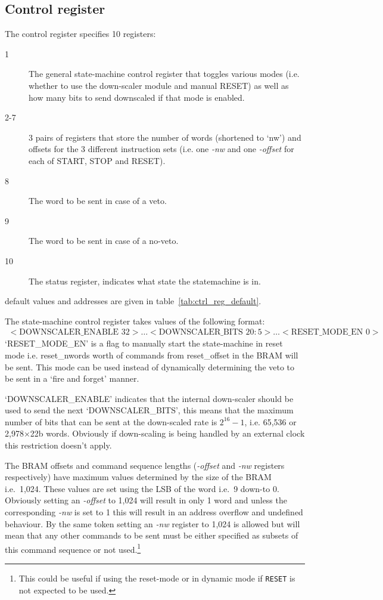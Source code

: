 \documentclass[]{report}
\begin{document}
    \subsection{Control register} %
    \label{sub:ctrl_reg}
    The control register specifies 10 registers:
    \begin{description}
        \item[1] The general state-machine control register that toggles various modes (i.e. whether to use the down-scaler module and manual RESET) as well as how many bits to send downscaled if that mode is enabled.
        \item[2-7] 3 pairs of registers that store the number of words (shortened to `nw') and offsets for the 3 different instruction sets (i.e. one \emph{-nw} and one \emph{-offset} for each of START, STOP and RESET).
        \item[8] The word to be sent in case of a veto.
        \item[9] The word to be sent in case of a no-veto.
        \item[10] The status register, indicates what state the statemachine is in.
    \end{description}
    default values and addresses are given in table~\ref{tab:ctrl_reg_default}.
    
    The state-machine control register takes values of the following format:
    \begin{align} \label{fmt:control_reg}
        <\text{DOWNSCALER\_ENABLE } 32>\ldots<\text{DOWNSCALER\_BITS } 20:5>\ldots<\text{RESET\_MODE\_EN } 0>
    \end{align}
    `RESET\_MODE\_EN' is a flag to manually start the state-machine in reset mode i.e. reset\_nwords worth of commands from reset\_offset in the BRAM will be sent. This mode can be used instead of dynamically determining the veto to be sent in a `fire and forget' manner.

    `DOWNSCALER\_ENABLE' indicates that the internal down-scaler should be used to send the next `DOWNSCALER\_BITS', this means that the maximum number of bits that can be sent at the down-scaled rate is \(2^{16} - 1\), i.e. 65,536 or 2,978\(\times\)22b words. Obviously if down-scaling is being handled by an external clock this restriction doesn't apply.

    The BRAM offsets and command sequence lengths (\emph{-offset} and \emph{-nw} registers respectively) have maximum values determined by the size of the BRAM i.e.\ 1,024. These values are set using the LSB of the word i.e.\ 9 down-to 0. Obviously setting an \emph{-offset} to 1,024 will result in only 1 word and unless the corresponding \emph{-nw} is set to 1 this will result in an address overflow and undefined behaviour. By the same token setting an \emph{-nw} register to 1,024 is allowed but will mean that any other commands to be sent must be either specified as subsets of this command sequence or not used.\footnote{This could be useful if using the reset-mode or in dynamic mode if \texttt{RESET} is not expected to be used.}
    
\end{document}
